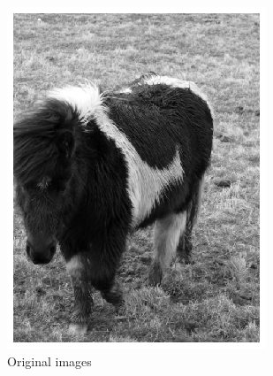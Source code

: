 \documentclass{l4proj}
\begin{document}
\begin{figure}[ht]
\begin{subfigure}[h!]{0.22\textwidth}
    \includegraphics[width=\textwidth]{images/autoencoder/pony_2/gray.png}
    \caption{Original images}
  \end{subfigure}
  \begin{subfigure}[h!]{0.22\textwidth}

\end{subfigure}
\end{figure}
\end{document}
